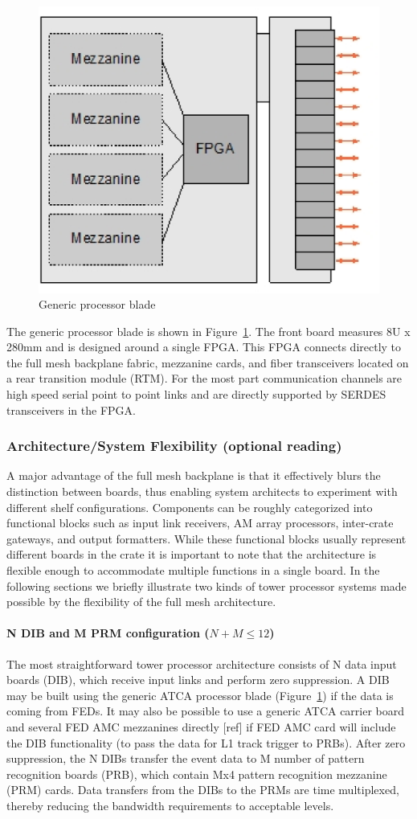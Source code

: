 \begin{figure}[ht!]
\centering
\includegraphics[width=0.4\columnwidth]{Plots/ProcBlade.eps}
\caption{Generic processor blade}
\label{fig:ProcBlade}
\end{figure}

\noindent The generic processor blade is shown in Figure~\ref{fig:ProcBlade}.  The front board measures 8U x 280mm and is designed around a single FPGA.  This FPGA connects directly to the full mesh backplane fabric, mezzanine cards, and fiber transceivers located on a rear transition module (RTM).  For the most part communication channels are high speed serial point to point links and are directly supported by SERDES transceivers in the FPGA.   

\subsubsection{Architecture/System Flexibility (optional reading)}

\noindent A major advantage of the full mesh backplane is that it effectively blurs the distinction between boards, thus enabling system architects to experiment with different shelf configurations.  Components can be roughly categorized into functional blocks such as input link receivers, AM array processors, inter-crate gateways, and output formatters.  While these functional blocks usually represent different boards in the crate it is important to note that the architecture is flexible enough to accommodate multiple functions in a single board.  In the following sections we briefly illustrate two kinds of tower processor systems made possible by the flexibility of the full mesh architecture.

\paragraph{N DIB and M PRM configuration ($N+M \le 12$)}

\noindent The most straightforward tower processor architecture consists of N data input boards (DIB), which receive input links and perform zero suppression.  A DIB may be built using the generic ATCA processor blade (Figure~\ref{fig:ProcBlade}) if the data is coming from FEDs.  It may also be possible to use a generic ATCA carrier board and several FED AMC mezzanines directly [ref] if FED AMC card will include the DIB functionality (to pass the data for L1 track trigger to PRBs).  After zero suppression, the N DIBs transfer the event data to M number of pattern recognition boards (PRB), which contain Mx4 pattern recognition mezzanine (PRM) cards.  Data transfers from the DIBs to the PRMs are time multiplexed, thereby reducing the bandwidth requirements to acceptable levels.  

